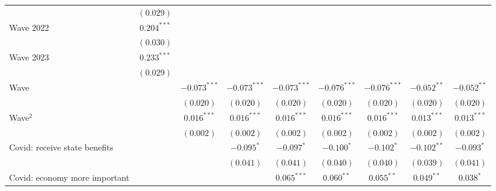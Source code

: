 \documentclass[
  12pt,
  10pt]{article}
\begin{document}
\begin{table}
{\begin{center}
{\begin{tabular}{l c c c c c c c c}
                                            & $(0.029)$      &                &                &                &                &                &                &                \\
\quad Wave 2022                             & $0.204^{***}$  &                &                &                &                &                &                &                \\
                                            & $(0.030)$      &                &                &                &                &                &                &                \\
\quad Wave 2023                             & $0.233^{***}$  &                &                &                &                &                &                &                \\
                                            & $(0.029)$      &                &                &                &                &                &                &                \\
Wave                                        &                & $-0.073^{***}$ & $-0.073^{***}$ & $-0.073^{***}$ & $-0.076^{***}$ & $-0.076^{***}$ & $-0.052^{**}$  & $-0.052^{**}$  \\
                                            &                & $(0.020)$      & $(0.020)$      & $(0.020)$      & $(0.020)$      & $(0.020)$      & $(0.020)$      & $(0.020)$      \\
Wave$^2$                                    &                & $0.016^{***}$  & $0.016^{***}$  & $0.016^{***}$  & $0.016^{***}$  & $0.016^{***}$  & $0.013^{***}$  & $0.013^{***}$  \\
                                            &                & $(0.002)$      & $(0.002)$      & $(0.002)$      & $(0.002)$      & $(0.002)$      & $(0.002)$      & $(0.002)$      \\
Covid: receive state benefits               &                &                & $-0.095^{*}$   & $-0.097^{*}$   & $-0.100^{*}$   & $-0.102^{*}$   & $-0.102^{**}$  & $-0.093^{*}$   \\
                                            &                &                & $(0.041)$      & $(0.041)$      & $(0.040)$      & $(0.040)$      & $(0.039)$      & $(0.041)$      \\
Covid: economy more important               &                &                &                & $0.065^{***}$  & $0.060^{**}$   & $0.055^{**}$   & $0.049^{**}$   & $0.038^{*}$    \\

\end{tabular}}
\end{center}}
\end{table}
\end{document}
